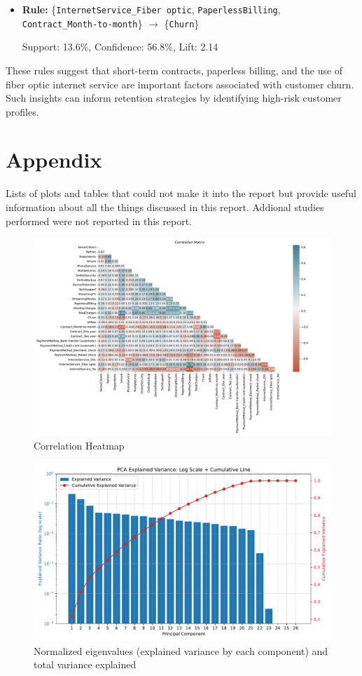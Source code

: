 \documentclass[a4paper,11pt]{article}
\begin{document}
\begin{itemize}
    \item \textbf{Rule:} \{\texttt{InternetService\_Fiber optic}, \texttt{PaperlessBilling}, \texttt{Contract\_Month-to-month}\} $\rightarrow$ \{\texttt{Churn}\}
    
    Support: 13.6\%, Confidence: 56.8\%, Lift: 2.14
\end{itemize}

These rules suggest that short-term contracts, paperless billing, and the use of fiber optic internet service are important factors associated with customer churn. Such insights can inform retention strategies by identifying high-risk customer profiles.


\section{Appendix}
Lists of plots and tables that could not make it into the report but provide useful information about all the things discussed in this report. Addional studies performed were not reported in this report.
\begin{figure}[H]
    \centering
    \includegraphics[width=\linewidth]{figures/understanding/correlation_matrix.pdf}
    \caption{Correlation Heatmap}
\end{figure}
\begin{figure}[H]
    \centering
    \includegraphics[width=0.8\linewidth]{figures/understanding/pca_explained_variance.pdf}
    \caption{Normalized eigenvalues (explained variance by each component) and total variance explained}
    \label{fig:enter-label}
\end{figure}
\end{document}
